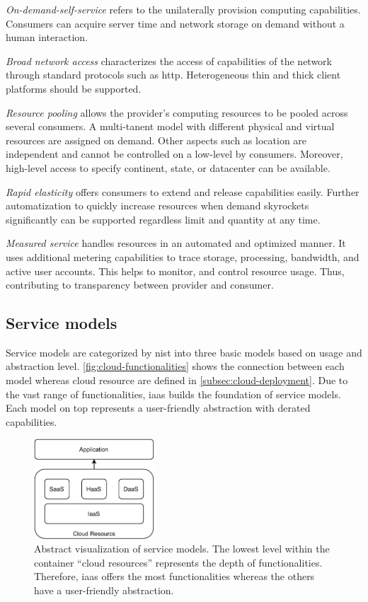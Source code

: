 \textit{On-demand-self-service} refers to the unilaterally provision computing capabilities.
Consumers can acquire server time and network storage on demand without a human interaction.

\textit{Broad network access} characterizes the access of capabilities of the network through standard protocols such as \ac{http}.
Heterogeneous thin and thick client platforms should be supported.

\textit{Resource pooling} allows the provider's computing resources to be pooled across several consumers.
A multi-tanent model with different physical and virtual resources are assigned on demand.
Other aspects such as location are independent and cannot be controlled on a low-level by consumers.
Moreover, high-level access to specify continent, state, or datacenter can be available.

\textit{Rapid elasticity} offers consumers to extend and release capabilities easily.
Further automatization to quickly increase resources  when demand skyrockets significantly can be supported regardless limit and quantity at any time.

\textit{Measured service} handles resources in an automated and optimized manner.
It uses additional metering capabilities to trace storage, processing, bandwidth, and active user accounts.
This helps to monitor, and control resource usage. Thus, contributing to transparency between provider and consumer.

\subsection{Service models}
\label{subsec:cloud-service}

Service models are categorized by \ac{nist} into three basic models based on usage and abstraction level.
\autoref{fig:cloud-functionalities} shows the connection between each model whereas cloud resource are defined in \autoref{subsec:cloud-deployment}.
Due to the vast range of functionalities, \ac*{iaas} builds the foundation of service models.
Each model on top represents a user-friendly abstraction with derated capabilities.

\begin{figure}[ht]
    \centering
    \includegraphics[width=0.4\textwidth]{figures/cloud-service-models.pdf}
    \caption[Abstract visualization of service models]{Abstract visualization of service models. The lowest level within the container \enquote{cloud resources} represents the depth of functionalities. Therefore, \ac{iaas} offers the most functionalities whereas the others have a user-friendly abstraction.}
    \label{fig:cloud-functionalities}
\end{figure}

